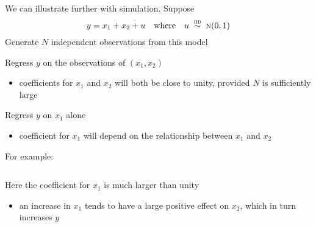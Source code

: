\begin{frame}

    \vspace{2em}
    We can illustrate further with simulation.  Suppose
    \begin{equation*}
        y = x_1 + x_2 + u  
        \quad \text{where} \quad
        u \stackrel {\textrm{ {\sc iid }}} {\sim} \textrm{\sc n}(0,1)
    \end{equation*}
    Generate $N$ independent observations from this model 
    
    \vspace{.7em}
    Regress $y$
    on the observations of $(x_1, x_2)$
    \begin{itemize}
        \item coefficients for $x_1$ and $x_2$ will both be close to
    unity, provided $N$ is sufficiently large
    \end{itemize}
    
    Regress $y$ on $x_1$ alone
    \begin{itemize}
        \item coefficient for $x_1$ will depend on the relationship between $x_1$ and $x_2$
    \end{itemize}
 
\end{frame}

\begin{frame}
    \vspace{2em}
     For example:
        \inputminted{r}{figs_code/small_sim.R}
        
        Here the coefficient for $x_1$ is much larger than unity
        \begin{itemize}
            \item an increase in $x_1$ tends to have a large positive effect on $x_2$,
        which in turn increases $y$
        \end{itemize}
        
\end{frame}

